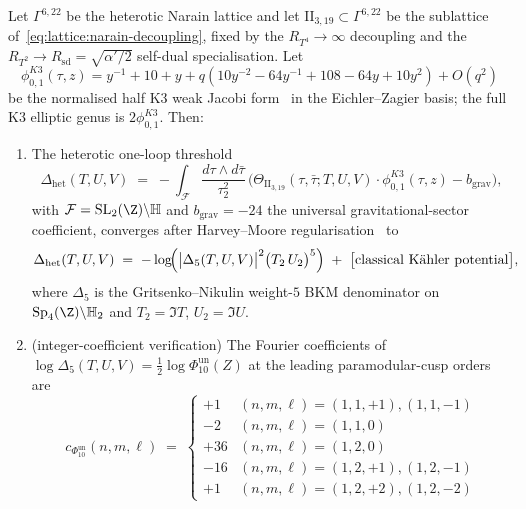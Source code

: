 \begin{theorem}
\label{thm:thqg-heterotic-delta5-lift}
Let $\Gamma^{6,22}$ be the heterotic Narain lattice and let
$\mathrm{II}_{3,19}\subset\Gamma^{6,22}$ be the sublattice
of~\eqref{eq:lattice:narain-decoupling}, fixed by the
$R_{T^4}\to\infty$ decoupling and the $R_{T^2}\to R_{\mathrm{sd}}
= \sqrt{\alpha'/2}$ self-dual specialisation. Let
\[
\phi_{0,1}^{K3}(\tau,z)
=y^{-1}+10+y
+q(10y^{-2}-64y^{-1}+108-64y+10y^2)+O(q^2)
\]
be the normalised half K3 weak Jacobi form~\cite{EguchiOoguriTachikawa2010}
in the Eichler--Zagier basis; the full K3 elliptic genus is
\(2\phi_{0,1}^{K3}\). Then:
\begin{enumerate}[label=\textup{(\roman*)}]
\item The heterotic one-loop threshold
\[
 \Delta_{\mathrm{het}}(T, U, V)
 \;=\;
 -\int_{\mathcal{F}}
 \frac{d\tau\wedge d\bar\tau}{\tau_2^2}\,
 \bigl(
 \Theta_{\mathrm{II}_{3,19}}(\tau, \bar\tau; T, U, V)\cdot
 \phi_{0,1}^{K3}(\tau, z)
 -
 b_{\mathrm{grav}}
 \bigr),
\]
with $\mathcal{F} = \mathrm{SL}_2(\Z)\backslash\mathbb{H}$ and
$b_{\mathrm{grav}} = -24$ the universal gravitational-sector
coefficient, converges after Harvey--Moore
regularisation~\cite[\S 5]{HarveyMoore1996} to
\begin{equation}\label{eq:thqg-het-delta5-identity}
\Delta_{\mathrm{het}}(T, U, V)
\;=\;
-\log\!\Bigl(\bigl|\Delta_5(T, U, V)\bigr|^2
\bigl(T_2\, U_2\bigr)^5\Bigr)
\;+\;
\bigl[\text{classical K\"ahler potential}\bigr],
\end{equation}
where $\Delta_5$ is the Gritsenko--Nikulin weight-$5$ BKM denominator
on $\mathrm{Sp}_4(\Z)\backslash\mathbb{H}_2$ and
$T_2 = \Im T$, $U_2 = \Im U$.
\item \textup{(integer-coefficient verification)} The Fourier
coefficients of
$\log\Delta_5(T, U, V) =
\tfrac{1}{2}\log\Phi_{10}^{\mathrm{un}}(Z)$
at the leading paramodular-cusp orders
are
\[
c_{\Phi_{10}^{\mathrm{un}}}(n, m, \ell)
\;=\;
\begin{cases}
+1 & (n, m, \ell) = (1, 1, +1), (1, 1, -1)\\
-2 & (n, m, \ell) = (1, 1, 0)\\
+36& (n, m, \ell) = (1, 2, 0)\\
-16& (n, m, \ell) = (1, 2, +1), (1, 2, -1)\\
+1 & (n, m, \ell) = (1, 2, +2), (1, 2, -2)

\end{cases}\]
\end{enumerate}
\end{theorem}
